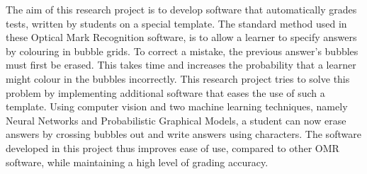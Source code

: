 


\begin{abstracts}        %
The aim of this research project is to develop software that automatically grades tests, written by students on a special template. The standard method used in these Optical Mark Recognition software, is to allow a learner to specify answers by colouring in bubble grids. To correct a mistake, the previous answer's bubbles must first be erased. This takes time and increases the probability that a learner might colour in the bubbles incorrectly. This research project tries to solve this problem by implementing additional software that eases the use of such a template. Using computer vision and two machine learning techniques, namely Neural Networks and Probabilistic Graphical Models, a student can now erase answers by crossing bubbles out and write answers using characters. The software developed in this project thus improves ease of use, compared to other OMR software, while maintaining a high level of grading accuracy.
\end{abstracts}
